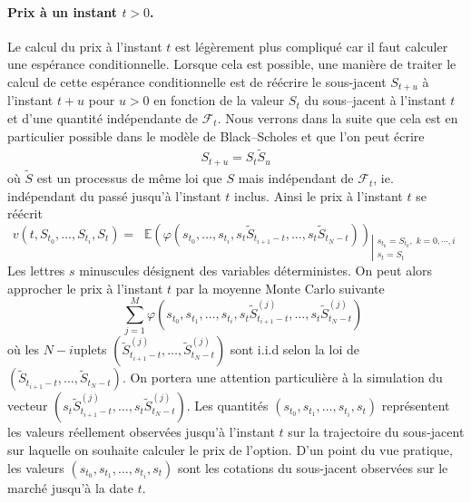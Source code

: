 \documentclass[a4paper,11pt]{article}
\def\cf{{\mathcal F}}
\def\E{{\mathbb E}}
\def\inv#1{\mathop{\frac{1}{ #1}}\nolimits}
\def\expp#1{\mathop {\mathrm{e}^{ #1}}}
\begin{document}
\paragraph{Prix à un instant $t>0$.}

Le calcul du prix à l'instant $t$ est légèrement plus compliqué car il faut
calculer une espérance conditionnelle. Lorsque cela est possible, une manière de
traiter le calcul de cette espérance conditionnelle est de réécrire le
sous-jacent $S_{t+u}$ à l'instant $t+u$ pour $u>0$ en fonction de la valeur
$S_t$ du sous--jacent à l'instant $t$ et d'une quantité indépendante de
$\cf_t$. Nous verrons dans la suite que cela est en particulier possible dans le
modèle de Black--Scholes et que l'on peut écrire
\begin{align*}
  S_{t+u} = S_t \tilde S_u
\end{align*}
où $\tilde S$ est un processus de même loi que $S$ mais indépendant de $\cf_t$, ie. indépendant du passé
jusqu'à l'instant $t$ inclus.
Ainsi le prix à l'instant $t$ se réécrit
\begin{equation*}
  v(t, S_{t_0}, \dots, S_{t_i}, S_t) = \expp{-r (T - t)} \E(\varphi(s_{t_0}, \dots,
  s_{t_i}, s_t \tilde S_{t_{i+1} - t}, \dots,  s_t \tilde S_{t_N - t}))_{\left|
  \begin{array}{l}
    s_{t_k} = S_{t_k}, \; k=0,\cdots,i \\
    s_t = S_t
  \end{array}\right.}
\end{equation*}
Les lettres $s$ minuscules désignent des variables déterministes.
On peut alors approcher le prix à l'instant $t$ par la moyenne Monte Carlo
suivante
\begin{equation}
  \label{MC_t}
  \expp{-r (T - t)} \inv{M} \sum_{j=1}^M \varphi(s_{t_0}, s_{t_1}, \dots,
  s_{t_i}, s_t \tilde S_{t_{i+1} - t}^{(j)}, \dots,  s_t \tilde S_{t_N - t}^{(j)})
\end{equation}
où les $N-i$uplets $(\tilde S_{t_{i+1} - t}^{(j)}, \dots, \tilde S_{t_N - t}^{(j)})$ sont
i.i.d selon la loi de $(\tilde S_{t_{i+1} - t}, \dots, \tilde S_{t_N - t})$. On portera
une attention particulière à la simulation du vecteur $(s_t \tilde S_{t_{i+1} - t}^{(j)},
\dots,  s_t \tilde S_{t_N - t}^{(j)})$. Les quantités $(s_{t_0}, s_{t_1}, \dots, s_{t_i},
s_t)$ représentent les valeurs réellement observées jusqu'à l'instant $t$ sur la
trajectoire du sous-jacent sur laquelle on souhaite calculer le prix de l'option. D'un
point du vue pratique, les valeurs $(s_{t_0}, s_{t_1}, \dots, s_{t_i}, s_t)$ sont les
cotations du sous-jacent observées sur le marché jusqu'à la date $t$.
\end{document}
